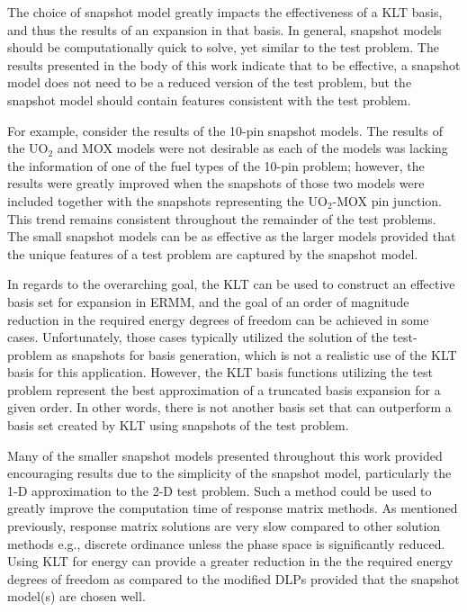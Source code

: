 The choice of snapshot model greatly impacts the effectiveness of a KLT basis, 
and thus the results of an expansion in that basis.  In general, snapshot 
models should be computationally quick to solve, yet similar to the test 
problem.  The results presented in the body of this work indicate that to be 
effective, a snapshot model does not need to be a reduced version of the test 
problem, but the snapshot model should contain features consistent with the 
test problem.  

For example, consider the results of the 10-pin snapshot 
models.  The results of the UO$_2$ and MOX models were not desirable as each of 
the models was lacking the information of one of the fuel types of the 10-pin 
problem; however, the results were greatly improved when the snapshots of those 
two models were included together with the snapshots representing the 
UO$_2$-MOX pin junction. This trend remains consistent throughout the 
remainder of the test problems.  The small snapshot models can be as 
effective as the larger models provided that the unique features of a test 
problem are captured by the snapshot model.  

In regards to the overarching goal, the KLT can be used to construct an 
effective basis set for expansion in ERMM, and the goal of an order of 
magnitude reduction in the required energy degrees of freedom can be achieved 
in some cases.  Unfortunately, those cases typically utilized the solution of 
the test-problem as snapshots for basis generation, which is not a realistic 
use of the KLT basis for this application.  However, the KLT basis functions 
utilizing the test problem represent the best approximation of a truncated 
basis expansion for a given order.  In other words, there is not another basis 
set that can outperform a basis set created by KLT using snapshots of the test 
problem.  

Many of the smaller snapshot models presented throughout this work provided 
encouraging results due to the simplicity of the snapshot model, particularly 
the 1-D approximation to the 2-D test problem.  Such a method could be 
used to greatly improve the computation time of response matrix methods.  
As mentioned previously, response matrix solutions are very slow compared 
to other solution methods e.g., discrete ordinance unless the phase space 
is significantly reduced.  Using KLT for energy can provide a greater reduction 
in the the required energy degrees of freedom as compared to the modified DLPs 
provided that the snapshot model(s) are chosen well. 

